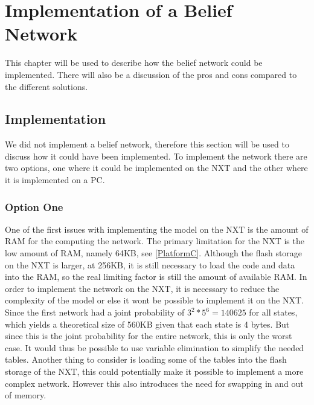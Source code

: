 \chapter{Implementation of a Belief Network}
This chapter will be used to describe how the belief network could be
implemented. There will also be a discussion of the pros and cons compared to
the different solutions.

\section{Implementation}
We did not implement a belief network, therefore this section will be used to
discuss how it could have been implemented. To implement the network there are
two options, one where it could be implemented on the NXT and the other where it is
implemented on a PC.

%

\subsection{Option One}
One of the first issues with implementing the model on the NXT is the amount of
RAM for the computing the network. The primary limitation for the NXT is the
low amount of RAM, namely 64KB, see \autoref{PlatformC}. Although the flash
storage on the NXT is larger, at 256KB, it is still necessary to load the code
and data into the RAM, so the real limiting factor is still the amount of
available RAM. In order to implement the network on the NXT, it is necessary to
reduce the complexity of the model or else it wont be possible to implement it on the NXT.
Since the first network had a joint probability of $3^2*5^6 = 140625$ for
all states, which yields a theoretical size of 560KB given that each state is 4
bytes. But since this is the joint probability for the entire network, this is only the
worst case. It would thus be possible to use variable elimination to simplify
the needed tables. Another thing to consider is loading some of the tables into
the flash storage of the NXT, this could potentially make it possible to
implement a more complex network. However this also introduces the need for
swapping in and out of memory.

